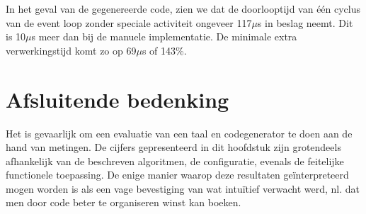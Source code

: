 In het geval van de gegenereerde code, zien we dat de doorlooptijd van \'e\'en
cyclus van de event loop zonder speciale activiteit ongeveer 117$\mu$s in
beslag neemt. Dit is 10$\mu$s meer dan bij de manuele implementatie. De
minimale extra verwerkingstijd komt zo op 69$\mu$s of 143\%.

\section{Afsluitende bedenking}

Het is gevaarlijk om een evaluatie van een taal en codegenerator te doen aan de
hand van metingen. De cijfers gepresenteerd in dit hoofdstuk zijn grotendeels
afhankelijk van de beschreven algoritmen, de configuratie, evenals de
feitelijke functionele toepassing. De enige manier waarop deze resultaten
ge\"interpreteerd mogen worden is als een vage bevestiging van wat intu\"itief
verwacht werd, nl. dat men door code beter te organiseren winst kan boeken.
